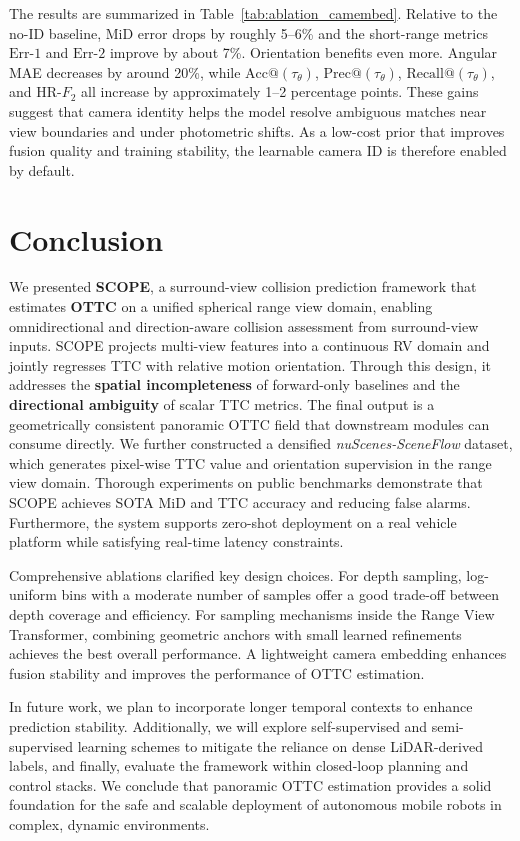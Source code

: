 \documentclass[journal]{IEEEtran}
\begin{document}
The results are summarized in Table~\ref{tab:ablation_camembed}. Relative to the no-ID baseline, MiD error drops by roughly 5--6\% and the short-range metrics $\text{Err-1}$ and $\text{Err-2}$ improve by about 7\%. Orientation benefits even more. Angular MAE decreases by around 20\%, while $\text{Acc@}(\tau_\theta)$, $\text{Prec@}(\tau_\theta)$, $\text{Recall@}(\tau_\theta)$, and HR-$F_2$ all increase by approximately 1--2 percentage points. These gains suggest that camera identity helps the model resolve ambiguous matches near view boundaries and under photometric shifts. As a low-cost prior that improves fusion quality and training stability, the learnable camera ID is therefore enabled by default.


\section{Conclusion}
\label{sec:con}

We presented \textbf{SCOPE}, a surround-view collision prediction framework that estimates \textbf{OTTC} on a unified spherical range view domain, enabling omnidirectional and direction-aware collision assessment from surround-view inputs. 
SCOPE projects multi-view features into a continuous RV domain and jointly regresses TTC with relative motion orientation. Through this design, it addresses the \textbf{spatial incompleteness} of forward-only baselines and the \textbf{directional ambiguity} of scalar TTC metrics. The final output is a geometrically consistent panoramic OTTC field that downstream modules can consume directly.
We further constructed a densified \textit{nuScenes-SceneFlow} dataset, which generates pixel-wise TTC value and orientation supervision in the range view domain. 
Thorough experiments on public benchmarks demonstrate that SCOPE achieves SOTA MiD and TTC accuracy and reducing false alarms. Furthermore, the system supports zero-shot deployment on a real vehicle platform while satisfying real-time latency constraints.

Comprehensive ablations clarified key design choices. For depth sampling, log-uniform bins with a moderate number of samples offer a good trade-off between depth coverage and efficiency. For sampling mechanisms inside the Range View Transformer, combining geometric anchors with small learned refinements achieves the best overall performance. A lightweight camera embedding enhances fusion stability and improves the performance of OTTC estimation.

In future work, we plan to incorporate longer temporal contexts to enhance prediction stability. Additionally, we will explore self-supervised and semi-supervised learning schemes to mitigate the reliance on dense LiDAR-derived labels, and finally, evaluate the framework within closed-loop planning and control stacks.
We conclude that panoramic OTTC estimation provides a solid foundation for the safe and scalable deployment of autonomous mobile robots in complex, dynamic environments.
\end{document}
